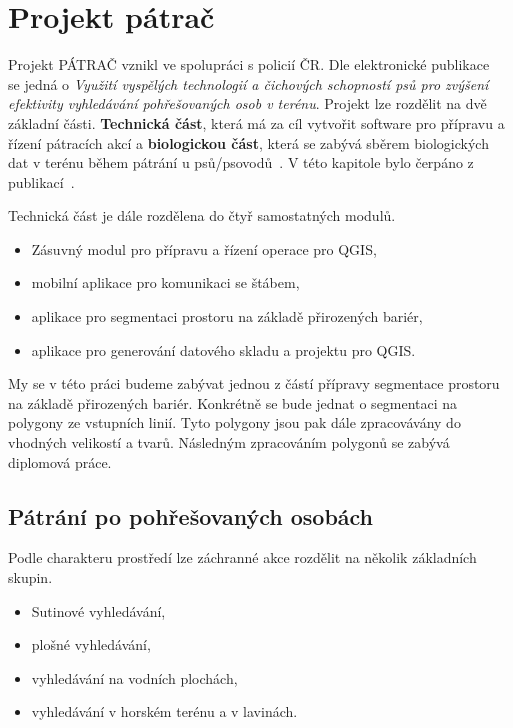 \chapter{Projekt pátrač} 
\label{chap:searchandrescue}

	Projekt PÁTRAČ vznikl ve spolupráci s policií ČR. Dle elektronické publikace~\cite{chaloupkova2017vyuziti} se jedná o \textit{Využití vyspělých technologií a čichových schopností psů pro zvýšení efektivity vyhledávání pohřešovaných osob v terénu}. Projekt lze rozdělit na dvě základní části. \textbf{Technická část}, která má za cíl vytvořit software pro přípravu a řízení pátracích akcí a \textbf{biologickou část}, která se zabývá sběrem biologických dat v terénu během pátrání u psů/psovodů~\cite{Zeman2009thesis}. V této kapitole bylo čerpáno z publikací~\cite{sladkova2019aplikace, Zeman2009thesis, pavlista2009rizeni, zachrana}.
	
	Technická část je dále rozdělena do čtyř samostatných modulů.
\begin{itemize}
	\item Zásuvný modul pro přípravu a řízení operace pro QGIS,
	\item mobilní aplikace pro komunikaci se štábem,
	\item aplikace pro segmentaci prostoru na základě přirozených bariér,
	\item aplikace pro generování datového skladu a projektu pro QGIS.
\end{itemize}	
My se v této práci budeme zabývat jednou z částí přípravy segmentace prostoru na základě přirozených bariér. Konkrétně se bude jednat o segmentaci na polygony ze vstupních linií. Tyto polygony jsou pak dále zpracovávány do vhodných velikostí a tvarů. Následným zpracováním polygonů se zabývá diplomová práce.

\section{Pátrání po pohřešovaných osobách}
	Podle charakteru prostředí lze záchranné akce rozdělit na několik základních skupin.
	
\begin{itemize}
	\item Sutinové vyhledávání,
	\item plošné vyhledávání,
	\item vyhledávání na vodních plochách,
	\item vyhledávání v horském terénu a v lavinách.
\end{itemize}	
	
